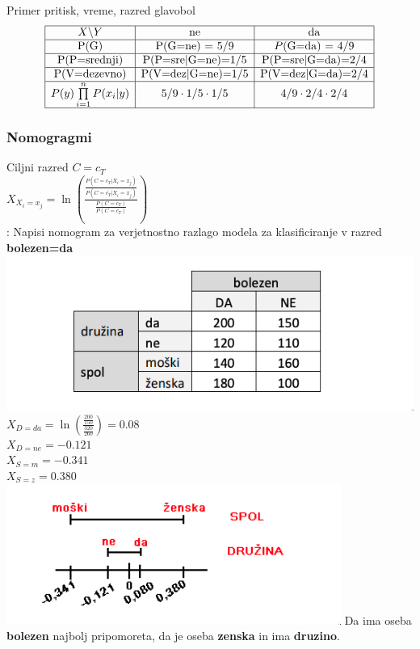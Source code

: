 Primer pritisk, vreme, razred glavobol
$$
\begin{array}{|c|c|c|}
    \hline
    X\backslash Y   & \text{ne}      & \text{da}\\
    \hline
    \text{P(G)}           & \text{P(G=ne) = 5/9}    & P\text{(G=da) = 4/9}\\
    \hline
    \text{P(P=srednji)}   & \text{P(P=sre|G=ne)=1/5} & \text{P(P=sre|G=da)=2/4}\\
    \hline
    \text{P(V=dezevno)} & \text{P(V=dez|G=ne)=1/5} & \text{P(V=dez|G=da)=2/4}\\
    \hline
    P(y)\prod\limits_{i=1}^n P(x_i|y) & \text{5/9}\cdot\text{1/5}\cdot\text{1/5} & \text{4/9}\cdot\text{2/4}\cdot\text{2/4}\\
    \hline
\end{array}
$$

\subsubsection{Nomogragmi}
Ciljni razred $C=c_T$\\
$X_{X_i=x_j}=\ln \left( \frac{\frac{P(C=c_T|X_i=x_j)}{P(C=\overline{c_T}|X_i=x_j)}}{\frac{P(C=c_T)}{P(C=\overline{c_T})}} \right) $\\
: Napisi nomogram za verjetnostno razlago modela za klasificiranje v razred \textbf{bolezen=da}\\
\includegraphics[width=\columnwidth]{images/nomogram.png}\\
$X_{D=da}=\ln \left( \frac{\frac{200}{150}}{\frac{320}{260}}\right) = 0.08$\\
$X_{D=ne}=-0.121$\\
$X_{S=m}=-0.341$\\
$X_{S=z}=0.380$\\
\includegraphics[width=\columnwidth]{images/nomogram2.png}
Da ima oseba \textbf{bolezen} najbolj pripomoreta, da je 
oseba \textbf{zenska} in ima \textbf{druzino}.

